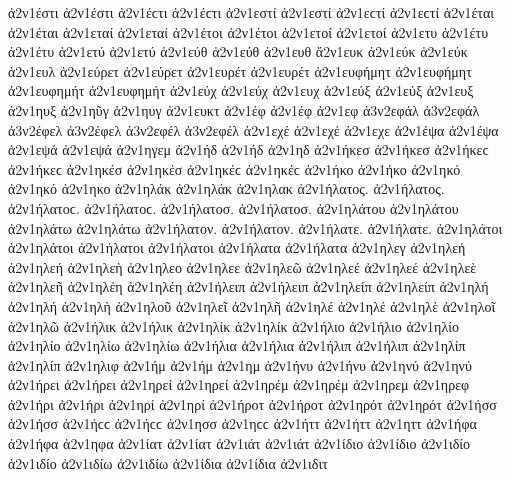 {ἀ2ν1έστι ἀ2ν1έστι ἀ2ν1έϲτι ἀ2ν1έϲτι   %
ἀ2ν1εστί ἀ2ν1εστί ἀ2ν1εϲτί ἀ2ν1εϲτί
ἀ2ν1έται ἀ2ν1έται   %
ἀ2ν1εταί ἀ2ν1εταί
ἀ2ν1έτοι ἀ2ν1έτοι   %
ἀ2ν1ετοί ἀ2ν1ετοί
ἀ2ν1ετυ   %
ἀ2ν1έτυ ἀ2ν1έτυ   %
ἀ2ν1ετύ ἀ2ν1ετύ
ἀ2ν1εύθ ἀ2ν1εύθ   %
ἀ2ν1ευθ
ἄ2ν1ευκ   %
ἀ2ν1εύκ ἀ2ν1εύκ
ἀ2ν1ευλ   %
ἀ2ν1εύρετ ἀ2ν1εύρετ   %
ἀ2ν1ευρέτ ἀ2ν1ευρέτ
ἀ2ν1ευφήμητ ἀ2ν1ευφήμητ   %
ἀ2ν1ευφημήτ ἀ2ν1ευφημήτ
ἀ2ν1εύχ ἀ2ν1εύχ   %
ἀ2ν1ευχ
ἀ2ν1εύξ ἀ2ν1εύξ   %
ἀ2ν1ευξ
ἀ2ν1ηυξ   %
ἀ2ν1ηῦγ   %
ἀ2ν1ηυγ
ἀ2ν1ευκτ   %
ἀ2ν1έφ ἀ2ν1έφ   %
ἀ2ν1εφ
ἀ3ν2εφάλ ἀ3ν2εφάλ   %
ἀ3ν2έφελ ἀ3ν2έφελ   %
ἀ3ν2εφέλ ἀ3ν2εφέλ
ἀ2ν1εχέ ἀ2ν1εχέ   %
ἀ2ν1εχε
ἀ2ν1έψα ἀ2ν1έψα   %
ἀ2ν1εψά ἀ2ν1εψά
ἀ2ν1ηγεμ   %
ἀ2ν1ήδ ἀ2ν1ήδ   %
ἀ2ν1ηδ
ἀ2ν1ήκεσ ἀ2ν1ήκεσ ἀ2ν1ήκεϲ ἀ2ν1ήκεϲ   %
ἀ2ν1ηκέσ ἀ2ν1ηκέσ ἀ2ν1ηκέϲ ἀ2ν1ηκέϲ
ἀ2ν1ήκο ἀ2ν1ήκο   %
ἀ2ν1ηκό ἀ2ν1ηκό
ἀ2ν1ηκο
ἀ2ν1ηλάκ ἀ2ν1ηλάκ   %
ἀ2ν1ηλακ
ἀ2ν1ήλατος. ἀ2ν1ήλατος. ἀ2ν1ήλατοϲ. ἀ2ν1ήλατοϲ.   %
ἀ2ν1ήλατοσ. ἀ2ν1ήλατοσ.
ἀ2ν1ηλάτου ἀ2ν1ηλάτου
ἀ2ν1ηλάτω ἀ2ν1ηλάτω
ἀ2ν1ήλατον. ἀ2ν1ήλατον.
ἀ2ν1ήλατε. ἀ2ν1ήλατε.
ἀ2ν1ηλάτοι ἀ2ν1ηλάτοι
ἀ2ν1ήλατοι ἀ2ν1ήλατοι
ἀ2ν1ήλατα ἀ2ν1ήλατα
ἀ2ν1ηλεγ   %
ἀ2ν1ηλεή ἀ2ν1ηλεή   %
ἀ2ν1ηλεὴ
ἀ2ν1ηλεο
ἀ2ν1ηλεε
ἀ2ν1ηλεῶ
ἀ2ν1ηλεέ ἀ2ν1ηλεέ
ἀ2ν1ηλεὲ
ἀ2ν1ηλεῆ
ἀ2ν1ηλέη ἀ2ν1ηλέη   %
ἀ2ν1ήλειπ ἀ2ν1ήλειπ   %
ἀ2ν1ηλείπ ἀ2ν1ηλείπ
ἀ2ν1ηλή ἀ2ν1ηλή   %
ἀ2ν1ηλὴ
ἀ2ν1ηλοῦ
ἀ2ν1ηλεῖ
ἀ2ν1ηλῆ
ἀ2ν1ηλέ ἀ2ν1ηλέ
ἀ2ν1ηλὲ
ἀ2ν1ηλοῖ
ἀ2ν1ηλῶ
ἀ2ν1ήλικ ἀ2ν1ήλικ   %
ἀ2ν1ηλίκ ἀ2ν1ηλίκ
ἀ2ν1ήλιο ἀ2ν1ήλιο   %
ἀ2ν1ηλίο ἀ2ν1ηλίο
ἀ2ν1ηλίω ἀ2ν1ηλίω
ἀ2ν1ήλια ἀ2ν1ήλια
ἀ2ν1ήλιπ ἀ2ν1ήλιπ   %
ἀ2ν1ηλίπ ἀ2ν1ηλίπ
ἀ2ν1ηλιφ   %
ἀ2ν1ήμ ἀ2ν1ήμ   %
ἀ2ν1ημ
ἀ2ν1ήνυ ἀ2ν1ήνυ   %
ἀ2ν1ηνύ ἀ2ν1ηνύ
ἀ2ν1ήρει ἀ2ν1ήρει   %
ἀ2ν1ηρεί ἀ2ν1ηρεί
ἀ2ν1ηρέμ ἀ2ν1ηρέμ   %
ἀ2ν1ηρεμ
ἀ2ν1ηρεφ   %
ἀ2ν1ήρι ἀ2ν1ήρι   %
ἀ2ν1ηρί ἀ2ν1ηρί
ἀ2ν1ήροτ ἀ2ν1ήροτ   %
ἀ2ν1ηρότ ἀ2ν1ηρότ
ἀ2ν1ήσσ ἀ2ν1ήσσ ἀ2ν1ήϲϲ ἀ2ν1ήϲϲ   %
ἀ2ν1ησσ ἀ2ν1ηϲϲ
ἀ2ν1ήττ ἀ2ν1ήττ   %
ἀ2ν1ηττ
ἀ2ν1ήφα ἀ2ν1ήφα   %
ἀ2ν1ηφα
ἀ2ν1ίατ ἀ2ν1ίατ   %
ἀ2ν1ιάτ ἀ2ν1ιάτ
ἀ2ν1ίδιο ἀ2ν1ίδιο   %
ἀ2ν1ιδίο ἀ2ν1ιδίο
ἀ2ν1ιδίω ἀ2ν1ιδίω
ἀ2ν1ίδια ἀ2ν1ίδια
ἀ2ν1ιδιτ   %
}
